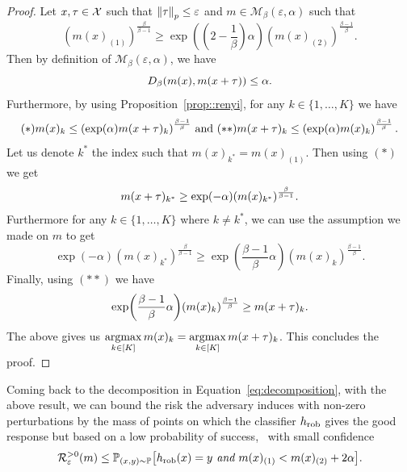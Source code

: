 \begin{proof}
Let $x , {\tau} \in \mathcal{X}$ such that  $\norm{{\tau}}_p \leq \varepsilon$ and $m  \in \mathcal{M}_{\beta}\left(\varepsilon,\alpha \right)$ such that $$\left(m (x )_{(1)}\right)^{\frac{\beta}{\beta - 1}} \geq \exp\left( (2-\frac{1}{\beta})\alpha \right) \left(m (x )_{(2)}\right)^{\frac{\beta-1}{\beta}}.$$
Then by definition of $ \mathcal{M}_{\beta}\left(\varepsilon,\alpha \right)$, we have $$D_{\beta}(m (x ),m ( x +{\tau})) \leq \alpha.$$ Furthermore, by using Proposition~\ref{prop::renyi}, for any $k \in \{1 ,\dots, K \}$ we have  $$ (*) m (x )_{k}\leq\left(\exp(\alpha)m (x +\perturb)_k\right)^{\frac{\beta-1}{\beta}}\text{ and } (**) m (x +\perturb)_{k}\leq\left(\exp(\alpha)m (x )_k\right)^{\frac{\beta-1}{\beta}} \equationspace.$$ 
Let us denote $k^*$ the index such that $m (x )_{k^*} =m (x )_{(1)} $. Then using $(*)$ we get $$m (x +{\tau})_{k^*} \geq \exp(-\alpha)(m (x )_{k^*})^{\frac{\beta}{\beta-1}}.$$
Furthermore for any $k \in \{1, \dots ,K\}$ where $k \neq k^*$, we can use the assumption we made on $m $ to get $$\exp(-\alpha)(m (x )_{k^*})^{\frac{\beta}{\beta-1}}\geq\exp(\frac{\beta-1}{\beta}\alpha)(m (x )_k)^{\frac{\beta-1}{\beta}}.$$
Finally, using $(**)$ we have
$$\exp(\frac{\beta-1}{\beta}\alpha)(m (x )_k)^{\frac{\beta-1}{\beta}} \geq m (x  + {\tau})_{k}.$$
The above gives us $\operatorname*{argmax}\limits_{k \in [K] }m (x )_{k}=\operatorname*{argmax}\limits_{k \in [K] }m (x +{\tau})_{k}$. This concludes the proof.
\end{proof}


Coming back to the decomposition in Equation~\eqref{eq:decomposition}, with the above result, we can bound the risk the adversary induces with non-zero perturbations by the mass of points on which the classifier ${h}_{\text{rob}}$ gives the good response but based on a low probability of success, \ie~with small confidence
\begin{equation}
\label{eq:premiseGeneralizationRandomizedSmoothing}
    \risk^{>0}_\varepsilon(m ) \leq \PP_{(x ,y)\sim \PP} \left[ \hypothesis_{\text{rob}}(x )=y \emph{ and } m (x )_{(1)} < m (x )_{(2)} +2 \alpha \right]. 
\end{equation}


